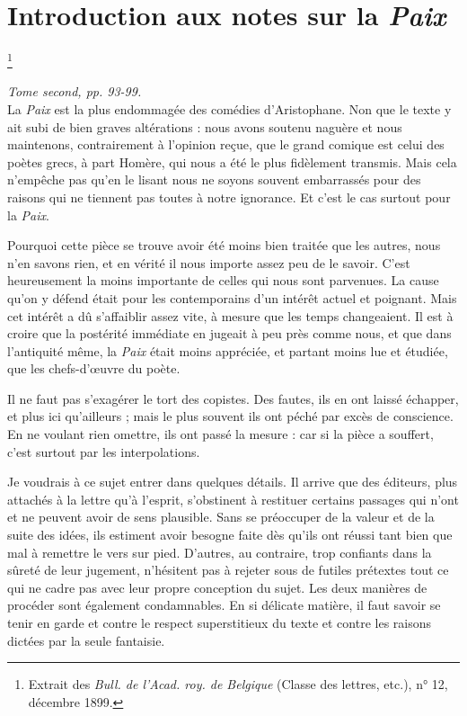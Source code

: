 \documentclass{book}%
\newcommand{\italique}[1]{\textit{#1}}%
\newcommand{\Note}[1]{\section*{#1}%
\addcontentsline{toc}{section}{#1}}
\newcommand{\note}[1]{\footnote{#1}}
\begin{document}
\Note{Introduction aux notes sur la \italique{Paix}}\note{Extrait des \italique{Bull. de l'Acad. roy. de Belgique} (Classe des lettres, etc.), n° 12, décembre 1899.}

\italique{Tome second, pp. 93-99.}\\


La \italique{Paix} est la plus endommagée des comédies d'Aristophane. Non que le texte y ait subi de bien graves altérations : nous avons soutenu naguère et nous maintenons, contrairement à l'opinion reçue, que le grand comique est celui des poètes grecs, à part Homère, qui nous a été le plus fidèlement transmis. Mais cela n'empêche pas qu'en le lisant nous ne soyons souvent embarrassés pour des raisons qui ne tiennent pas toutes à notre ignorance. Et c'est le cas surtout pour la \italique{Paix}. 

Pourquoi cette pièce se trouve avoir été moins bien traitée que les autres, nous n'en savons rien, et en vérité il nous importe assez peu de le savoir. C'est heureusement la moins importante de celles qui nous sont parvenues. La cause qu'on y défend était pour les contemporains d'un intérêt actuel et poignant. Mais cet intérêt a dû s'affaiblir assez vite, à mesure que les temps changeaient. Il est à croire que la postérité immédiate en jugeait à peu près comme nous, et que dans l'antiquité même, la \italique{Paix} était moins appréciée, et partant moins lue et étudiée, que les chefs-d'œuvre du poète. 

Il ne faut pas s'exagérer le tort des copistes. Des fautes, ils en ont laissé échapper, et plus ici qu'ailleurs ; mais le plus souvent ils ont péché par excès de conscience. En ne voulant rien omettre, ils ont passé la mesure : car si la pièce a souffert, c'est surtout par les interpolations. 

Je voudrais à ce sujet entrer dans quelques détails. Il arrive que des éditeurs, plus attachés à la lettre qu'à l'esprit, s'obstinent à restituer certains passages qui n'ont et ne peuvent avoir de sens plausible. Sans se préoccuper de la valeur et de la suite des idées, ils estiment avoir besogne faite dès qu'ils ont réussi tant bien que mal à remettre le vers sur pied. D'autres, au contraire, trop confiants dans la sûreté de leur jugement, n'hésitent pas à rejeter sous de futiles prétextes tout ce qui ne cadre pas avec leur propre conception du sujet. Les deux manières de procéder sont également condamnables. En si délicate matière, il faut savoir se tenir en garde et contre le respect superstitieux du texte et contre les raisons dictées par la seule fantaisie. 
\end{document}
